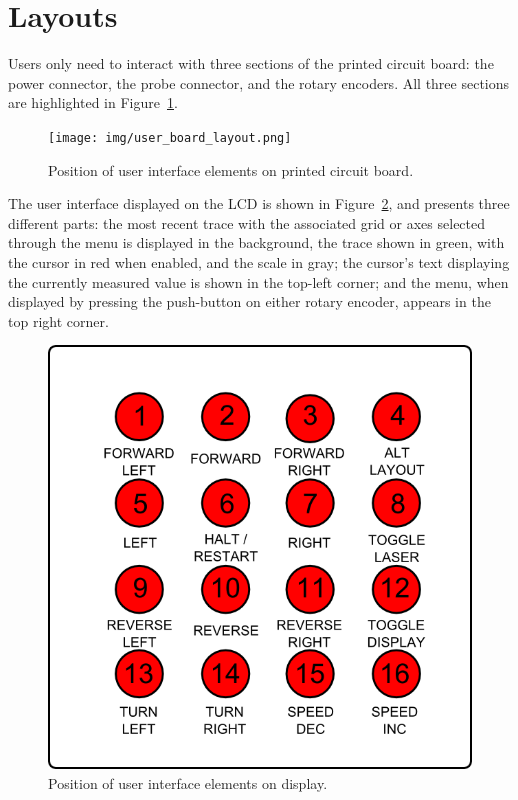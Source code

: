 \documentclass{scrartcl}
\begin{document}
	\section{Layouts}
	Users only need to interact with three sections of the printed circuit board: the power connector, the probe connector, and the rotary encoders. All three sections are highlighted in Figure~\ref{fig:user_board_layout}. \\

	\begin{figure}[h!]
	\texttt{[image: img/user\_board\_layout.png]}
                	\caption{Position of user interface elements on printed circuit board.}
               	\label{fig:user_board_layout}
	\end{figure}

	The user interface displayed on the LCD is shown in Figure~\ref{fig:user_screen_layout}, and presents three different parts: the most recent trace with the associated grid or axes selected through the menu is displayed in the background, the trace shown in green, with the cursor in red when enabled, and the scale in gray; the cursor's text displaying the currently measured value is shown in the top-left corner; and the menu, when displayed by pressing the push-button on either rotary encoder, appears in the top right corner.

	\begin{figure}[t]
	\includegraphics[width=\textwidth]{img/user_screen_layout.png}
                	\caption{Position of user interface elements on display.}
               	\label{fig:user_screen_layout}
	\end{figure}
\end{document}
